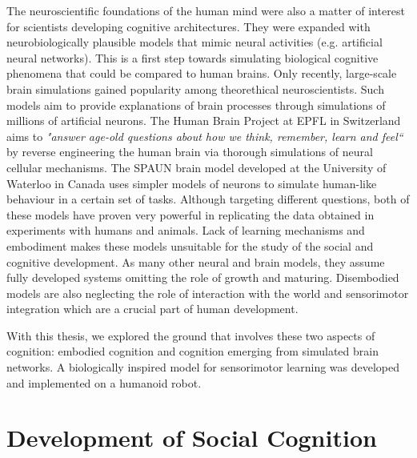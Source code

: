 The neuroscientific foundations of the human mind were also a matter of 
interest 
for scientists developing cognitive architectures.
They were expanded with neurobiologically plausible models 
that mimic neural activities (e.g. artificial neural networks). This is a first 
step towards simulating biological cognitive phenomena that could be compared 
to human brains. Only recently, large-scale brain simulations gained popularity 
among theorethical neuroscientists. Such models aim to provide explanations of 
brain processes through simulations of millions of artificial neurons. The 
Human Brain Project at EPFL in Switzerland aims to \emph{"answer age-old 
questions about how we think, remember, learn and feel``} \citep{Markram201139} 
by reverse engineering the human brain via thorough simulations of neural 
cellular mechanisms. The SPAUN brain model \citep{eliasmith_large-scale_2012} 
developed at the University of Waterloo in Canada uses simpler models of 
neurons to simulate human-like behaviour in a certain set of tasks. Although 
targeting different questions, both of these models 
have proven very powerful in replicating the data obtained in experiments with 
humans and animals. Lack of learning mechanisms and embodiment makes these 
models unsuitable for the study of the social and cognitive development. As 
many other neural and brain models, they assume fully developed systems 
omitting 
the role of growth and maturing. Disembodied models are also neglecting the 
role of interaction with the world and sensorimotor integration which are a 
crucial part of human development.

With this thesis, we explored the ground that involves these two aspects of 
cognition: embodied cognition and cognition emerging from simulated brain 
networks. A biologically inspired model for sensorimotor learning was developed 
and implemented on a humanoid robot. 


\section{Development of Social Cognition}
\label{sec:devsoccog}

